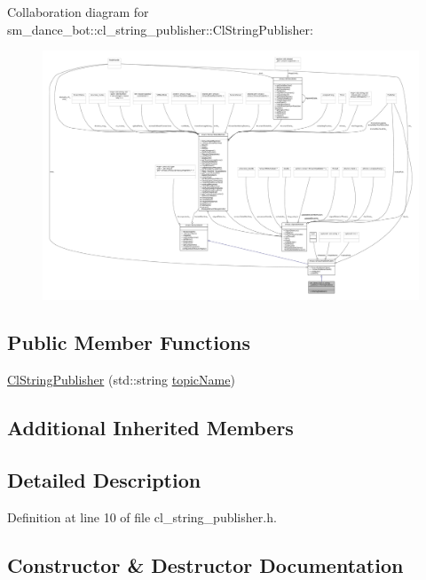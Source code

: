Collaboration diagram for sm\+\_\+dance\+\_\+bot\+:\+:cl\+\_\+string\+\_\+publisher\+:\+:Cl\+String\+Publisher\+:
\nopagebreak
\begin{figure}[H]
\begin{center}
\leavevmode
\includegraphics[width=350pt]{classsm__dance__bot_1_1cl__string__publisher_1_1ClStringPublisher__coll__graph}
\end{center}
\end{figure}
\subsection*{Public Member Functions}
\begin{DoxyCompactItemize}
\item 
\hyperlink{classsm__dance__bot_1_1cl__string__publisher_1_1ClStringPublisher_aee0c825fe0c073dbb5e676bb396cac39}{Cl\+String\+Publisher} (std\+::string \hyperlink{classsmacc_1_1SmaccPublisherClient_a4b8401543c3d532e81453c9106ddaefc}{topic\+Name})
\end{DoxyCompactItemize}
\subsection*{Additional Inherited Members}


\subsection{Detailed Description}


Definition at line 10 of file cl\+\_\+string\+\_\+publisher.\+h.



\subsection{Constructor \& Destructor Documentation}
